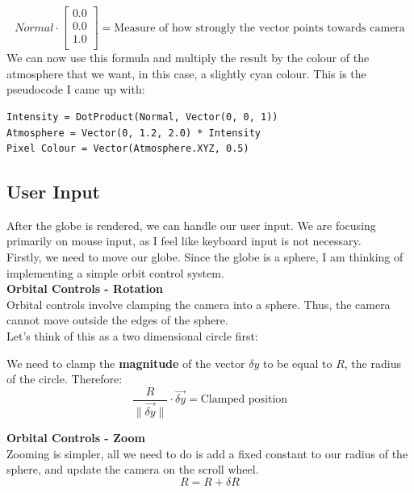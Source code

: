 $$
Normal \cdot \begin{bmatrix} 0.0 \\ 0.0 \\ 1.0 \\ \end{bmatrix}
	= \textrm{Measure of how strongly the vector points towards camera}
$$
We can now use this formula and multiply the result by the colour of the atmosphere that we want, in this case, a slightly cyan colour. This is the pseudocode I came up with:
\begin{lstlisting}
Intensity = DotProduct(Normal, Vector(0, 0, 1))
Atmosphere = Vector(0, 1.2, 2.0) * Intensity
Pixel Colour = Vector(Atmosphere.XYZ, 0.5)
\end{lstlisting}

\subsection{User Input}
After the globe is rendered, we can handle our user input. We are focusing primarily on mouse input, as I feel like keyboard input is not necessary. \\
Firstly, we need to move our globe. Since the globe is a sphere, I am thinking of implementing a simple orbit control system. \\

\textbf{Orbital Controls - Rotation} \\
Orbital controls involve clamping the camera into a sphere. Thus, the camera cannot move outside the edges of the sphere. \\
Let's think of this as a two dimensional circle first:
\begin{center}
\end{center}
We need to clamp the \textbf{magnitude} of the vector $\delta y$ to be equal to $R$, the radius of the circle. Therefore:
$$\frac{R}{\|\vec{\delta y}\|} \cdot \vec{\delta y} = \textrm{Clamped position}$$

\textbf{Orbital Controls - Zoom} \\
Zooming is simpler, all we need to do is add a fixed constant to our radius of the sphere, and update the camera on the scroll wheel.
$$R = R + \delta R$$


